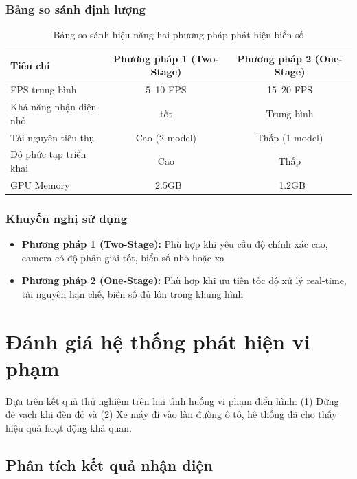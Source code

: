 \subsubsection{Bảng so sánh định lượng}
\begin{table}[H]
\centering
\caption{Bảng so sánh hiệu năng hai phương pháp phát hiện biển số}
\label{tab:method_comparison}
\begin{tabular}{|l|c|c|}
\hline
\textbf{Tiêu chí} & \textbf{Phương pháp 1 (Two-Stage)} & \textbf{Phương pháp 2 (One-Stage)} \\ \hline
FPS trung bình & 5--10 FPS & 15--20 FPS \\ \hline
Khả năng nhận diện nhỏ & tốt & Trung bình \\ \hline
Tài nguyên tiêu thụ & Cao (2 model) & Thấp (1 model) \\ \hline
Độ phức tạp triển khai & Cao & Thấp \\ \hline

GPU Memory & ~2.5GB & ~1.2GB \\ \hline
\end{tabular}
\end{table}

\subsubsection{Khuyến nghị sử dụng}
\begin{itemize}
    \item \textbf{Phương pháp 1 (Two-Stage):} Phù hợp khi yêu cầu độ chính xác cao, camera có độ phân giải tốt, biển số nhỏ hoặc xa
    \item \textbf{Phương pháp 2 (One-Stage):} Phù hợp khi ưu tiên tốc độ xử lý real-time, tài nguyên hạn chế, biển số đủ lớn trong khung hình
\end{itemize}

\section{Đánh giá hệ thống phát hiện vi phạm}

Dựa trên kết quả thử nghiệm trên hai tình huống vi phạm điển hình: (1) Dừng đè vạch khi đèn đỏ và (2) Xe máy đi vào làn đường ô tô, hệ thống đã cho thấy hiệu quả hoạt động khả quan.

\subsection{Phân tích kết quả nhận diện}

